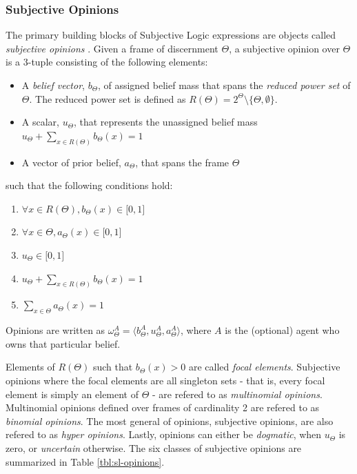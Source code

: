 \documentclass[thesis.tex]{subfiles}
\begin{document}
\subsubsection{Subjective Opinions}

The primary building blocks of Subjective Logic expressions are
objects called \emph{subjective opinions} \cite{josang2001logic}. Given a frame of discernment $\Theta$, a subjective
opinion over $\Theta$ is a 3-tuple consisting of the following elements:

\begin{itemize}
  \item A \emph{belief vector}, $b_\Theta$, of assigned belief mass that spans the \emph{reduced power set}
    of $\Theta$. The reduced power set is defined as $R \left(\Theta\right) = 2^\Theta \setminus \lbrace \Theta, \emptyset \rbrace$.
  \item A scalar, $u_\Theta$, that represents the unassigned belief mass
    $u_\Theta + \sum_{x \in R\left(\Theta\right)} b_\Theta\left(x\right) = 1$
  \item A vector of prior belief, $a_\Theta$, that spans the frame $\Theta$
\end{itemize}

such that the following conditions hold:

\begin{enumerate}
  \item $\forall x \in R\left(\Theta\right), b_\Theta\left(x\right) \in \lbrack 0, 1\rbrack$
  \item $\forall x \in \Theta, a_\Theta\left(x\right) \in \lbrack 0, 1\rbrack$
  \item $u_\Theta \in \lbrack 0, 1\rbrack$
  \item $u_\Theta + \sum_{x \in R\left(\Theta\right)} b_\Theta\left(x\right) = 1$
  \item $\sum_{x \in \Theta} a_\Theta\left(x\right) = 1$
\end{enumerate}

Opinions are written as $\omega^A_\Theta = \langle b^A_\Theta, u^A_\Theta, a^A_\Theta \rangle$, where
$A$ is the (optional) agent who owns that particular belief.

Elements of $R\left(\Theta\right)$ such that $b_\Theta\left(x\right) > 0$ are called \emph{focal elements}.
Subjective opinions where the focal elements are all singleton sets - that is, every focal element is
simply an element of $\Theta$ - are refered to as \emph{multinomial opinions}. Multinomial opinions
defined over frames of cardinality 2 are refered to as \emph{binomial opinions}. The most general of
opinions, subjective opinions, are also refered to as \emph{hyper opinions}. Lastly, opinions can either
be \emph{dogmatic}, when $u_\Theta$ is zero, or \emph{uncertain} otherwise. The six classes of subjective
opinions are summarized in Table \ref{tbl:sl-opinions}.
\end{document}
